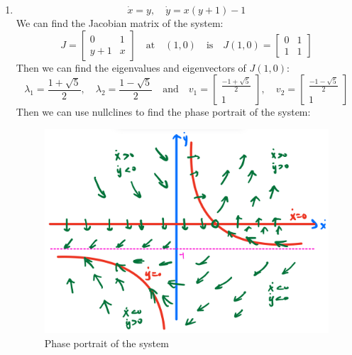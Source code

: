 \documentclass[12pt]{exam}
\begin{document}
\begin{enumerate}
	\newpage
	\item \[ \dot{x} = y, \quad \dot{y} = x(y+1)-1 \]
	We can find the Jacobian matrix of the system:
	\[ J = \begin{bmatrix}
		0 & 1 \\
		y+1 & x
	\end{bmatrix} \quad \text{at} \quad (1,0) \quad \text{is} \quad J(1,0) = \begin{bmatrix}
		0 & 1 \\
		1 & 1
	\end{bmatrix} \]
	Then we can find the eigenvalues and eigenvectors of $J(1,0)$:
	\[ \lambda_1 = \frac{1+\sqrt{5}}{2}, \quad \lambda_2 = \frac{1-\sqrt{5}}{2} \quad \text{and} \quad v_1 = \begin{bmatrix}
		\frac{-1+\sqrt{5}}{2} \\
		1
	\end{bmatrix}, \quad v_2 = \begin{bmatrix}
		\frac{-1-\sqrt{5}}{2} \\
		1
	\end{bmatrix} \]
	Then we can use nullclines to find the phase portrait of the system:
	\begin{figure}[H]
		\centering
		\includegraphics[width=0.9\linewidth]{1b.jpeg}
		\caption{Phase portrait of the system}
		\label{fig:1b}
	\end{figure}
\end{enumerate}
\end{document}
